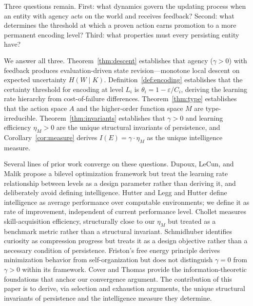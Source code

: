 \documentclass[11pt]{article}
\theoremstyle{definition}
\theoremstyle{remark}
\begin{document}
Three questions remain. First: what dynamics govern the updating
process when an entity with agency acts on the world and receives
feedback? Second: what determines the threshold at which a proven
action earns promotion to a more permanent encoding level? Third:
what properties must every persisting entity have?

We answer all three. Theorem~\ref{thm:descent} establishes that
agency ($\gamma > 0$) with feedback produces evaluation-driven state
revision---monotone local descent on expected uncertainty
$H(W \mid K)$. Definition~\ref{def:encoding} establishes that the
certainty threshold for encoding at level $L_i$ is
$\theta_i = 1 - \varepsilon / C_i$, deriving the learning rate
hierarchy from cost-of-failure differences.
Theorem~\ref{thm:type} establishes that the action space $A$ and the
higher-order function space $M$ are type-irreducible.
Theorem~\ref{thm:invariants} establishes that $\gamma > 0$ and
learning efficiency $\eta_M > 0$ are the unique structural invariants
of persistence, and Corollary~\ref{cor:measure} derives
$I(E) = \gamma \cdot \eta_M$ as the unique intelligence measure.

Several lines of prior work converge on these questions.
Dupoux, LeCun, and Malik \cite{DupouxLeCunMalik2026} propose a
bilevel optimization framework but treat the learning rate
relationship between levels as a design parameter rather than deriving
it, and deliberately avoid defining intelligence. Hutter
\cite{Hutter2005} and Legg and Hutter \cite{LeggHutter2007} define
intelligence as average performance over computable environments;
we define it as rate of improvement, independent of current
performance level. Chollet \cite{Chollet2019} measures
skill-acquisition efficiency, structurally close to our $\eta_M$ but
treated as a benchmark metric rather than a structural invariant.
Schmidhuber \cite{Schmidhuber2010} identifies curiosity as compression
progress but treats it as a design objective rather than a necessary
condition of persistence. Friston's free energy principle
\cite{Friston2010} derives minimization behavior from
self-organization but does not distinguish $\gamma = 0$ from
$\gamma > 0$ within its framework. Cover and Thomas \cite{Cover2006}
provide the information-theoretic foundations that anchor our
convergence argument. The contribution of this paper is to derive,
via selection and exhaustion arguments, the unique structural
invariants of persistence and the intelligence measure they determine.

\end{document}
